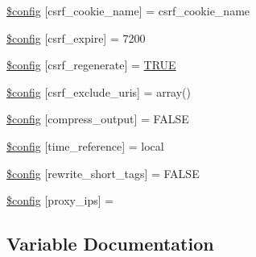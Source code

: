 \begin{DoxyCompactItemize}
\item 
\mbox{\hyperlink{application_2config_2config_8php_ac049a8e8df7d6ac2e8f16110f3a34709}{\$config}} \mbox{[}\textquotesingle{}csrf\+\_\+cookie\+\_\+name\textquotesingle{}\mbox{]} = \textquotesingle{}csrf\+\_\+cookie\+\_\+name\textquotesingle{}
\item 
\mbox{\hyperlink{application_2config_2config_8php_af11d827f96f9386ca7c873c2463df384}{\$config}} \mbox{[}\textquotesingle{}csrf\+\_\+expire\textquotesingle{}\mbox{]} = 7200
\item 
\mbox{\hyperlink{application_2config_2config_8php_ac0706e1569f781ed857ecc183f084c1a}{\$config}} \mbox{[}\textquotesingle{}csrf\+\_\+regenerate\textquotesingle{}\mbox{]} = \mbox{\hyperlink{constants_8php_ae04a3efe6aa42044f803ee90c2277846}{T\+R\+UE}}
\item 
\mbox{\hyperlink{application_2config_2config_8php_a4fa2da3e7d0304b3b81e8d9eace08891}{\$config}} \mbox{[}\textquotesingle{}csrf\+\_\+exclude\+\_\+uris\textquotesingle{}\mbox{]} = array()
\item 
\mbox{\hyperlink{application_2config_2config_8php_a3a676836543f524feb59e3bb8ea1664c}{\$config}} \mbox{[}\textquotesingle{}compress\+\_\+output\textquotesingle{}\mbox{]} = F\+A\+L\+SE
\item 
\mbox{\hyperlink{application_2config_2config_8php_aff823b412a71ef1f2e5994cfef7a3388}{\$config}} \mbox{[}\textquotesingle{}time\+\_\+reference\textquotesingle{}\mbox{]} = \textquotesingle{}local\textquotesingle{}
\item 
\mbox{\hyperlink{application_2config_2config_8php_a2e70aedb292bc2c7ffe41375675f82a4}{\$config}} \mbox{[}\textquotesingle{}rewrite\+\_\+short\+\_\+tags\textquotesingle{}\mbox{]} = F\+A\+L\+SE
\item 
\mbox{\hyperlink{application_2config_2config_8php_af32d3a811414b59e8e0fb72528fccc4f}{\$config}} \mbox{[}\textquotesingle{}proxy\+\_\+ips\textquotesingle{}\mbox{]} = \textquotesingle{}\textquotesingle{}
\end{DoxyCompactItemize}


\subsection{Variable Documentation}
\mbox{\label{application_2config_2config_8php_ab7d3dc1aba181a1198e7f26609046673}} 
